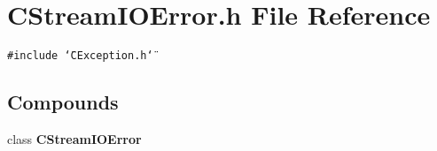 \section{CStream\-IOError.h File Reference}
\label{CStreamIOError_8h}
{\tt \#include \char`\"{}CException.h\char`\"{}}\par
\subsection*{Compounds}
\begin{CompactItemize}
\item 
class {\bf CStream\-IOError}
\end{CompactItemize}
